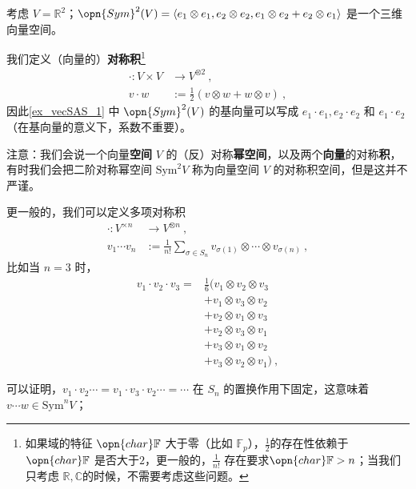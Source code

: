 \begin{example}{}\label{ex_vecSAS_1}
考虑 $V = \mathbb{R}^2$；$\opn{Sym}^2(V) = \langle e_1 \otimes e_1, e_2 \otimes e_2, e_1 \otimes e_2 + e_2 \otimes e_1 \rangle$ 是一个三维向量空间。
\end{example}

我们定义（向量的）\textbf{对称积}\footnote{如果域的特征 $\opn{char} \mathbb{F}$ 大于零（比如 $\mathbb{F}_p$），$\frac{1}{2}$的存在性依赖于 $\opn{char} \mathbb{F}$ 是否大于$2$，更一般的，$\frac{1}{n!}$ 存在要求$\opn{char} \mathbb{F} > n$；当我们只考虑 $\mathbb{R}, \mathbb{C}$的时候，不需要考虑这些问题。}
\begin{equation}
\begin{aligned}
\cdot: V \times V &\to V^{\otimes 2}~, \\
v \cdot w &:= \frac12 (v \otimes w + w \otimes v)~,
\end{aligned}
\end{equation}
因此\autoref{ex_vecSAS_1} 中 $\opn{Sym}^2(V)$ 的基向量可以写成 $e_1 \cdot e_1, e_2 \cdot e_2$ 和 $e_1 \cdot e_2$ （在基向量的意义下，系数不重要）。

注意：我们会说一个向量\textbf{空间} $V$ 的（反）对称\textbf{幂空间}，以及两个\textbf{向量}的对称\textbf{积}，有时我们会把二阶对称幂空间 $\text{Sym}^2 V$ 称为向量空间 $V$ 的对称积空间，但是这并不严谨。

更一般的，我们可以定义多项对称积
\begin{equation}
\begin{aligned}
\cdot: V^{\times n} &\to V^{\otimes n}~, \\
v_1 \cdots v_n &:= \frac{1}{n!} \sum_{\sigma \in S_n} v_{\sigma(1)} \otimes \cdots \otimes v_{\sigma(n)}~,
\end{aligned}
\end{equation}
比如当 $n = 3$ 时，
\begin{equation}
\begin{aligned}
v_1 \cdot v_2 \cdot v_3 = &\frac16 (v_1 \otimes v_2 \otimes v_3 \\
&+ v_1 \otimes v_3 \otimes v_2 \\
&+ v_2 \otimes v_1 \otimes v_3 \\
&+ v_2 \otimes v_3 \otimes v_1 \\
&+ v_3 \otimes v_1 \otimes v_2 \\
&+ v_3 \otimes v_2 \otimes v_1)~,
\end{aligned}
\end{equation}

可以证明，$v_1 \cdot v_2 \cdots = v_1 \cdot v_3 \cdot v_2 \cdots = \cdots$ 在 $S_n$ 的置换作用下固定，这意味着$v \cdots w \in \text{Sym}^n V$；

